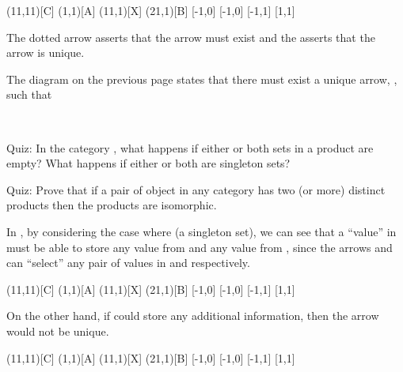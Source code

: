 \documentclass{seminar}
\begin{document}
\begin{slide}
\newslide

\begin{cdiag}
\obj(11,11)[C]{}
\obj(1,1)[A]{}
\obj(11,1)[X]{}
\obj(21,1)[B]{}
[-1,0]
[-1,0]
[-1,1]
[1,1]
\end{cdiag}

The dotted arrow asserts that the arrow must exist and the \; \tm{!} \;
asserts that the arrow is unique.

\newpage

The diagram on the previous
page states that there must exist a unique arrow, ,
such that
\begin{mcode}
\\
\end{mcode}

\newslide

Quiz:  \textcolor{QuoteColor}{In the category ,
what happens if either or both sets
in a product are empty?  What happens if either or both are singleton
sets?}

Quiz:  \textcolor{QuoteColor}{Prove that if a pair of object
in any category has two (or more)
distinct products then the products are isomorphic.}

\newslide

In , by considering the case where 
(a singleton set), we can see that a ``value'' in 
must be able to store any value from  and any value from ,
since the arrows  and  can ``select'' any pair of values
in  and  respectively.

\begin{cdiag}
\obj(11,11)[C]{}
\obj(1,1)[A]{}
\obj(11,1)[X]{}
\obj(21,1)[B]{}
[-1,0]
[-1,0]
[-1,1]
[1,1]
\end{cdiag}

\newpage

On the other hand, if  could store any additional
information, then the arrow  would not be unique.

\begin{cdiag}
\obj(11,11)[C]{}
\obj(1,1)[A]{}
\obj(11,1)[X]{}
\obj(21,1)[B]{}
[-1,0]
[-1,0]
[-1,1]
[1,1]
\end{cdiag}


\end{slide}
\end{document}
